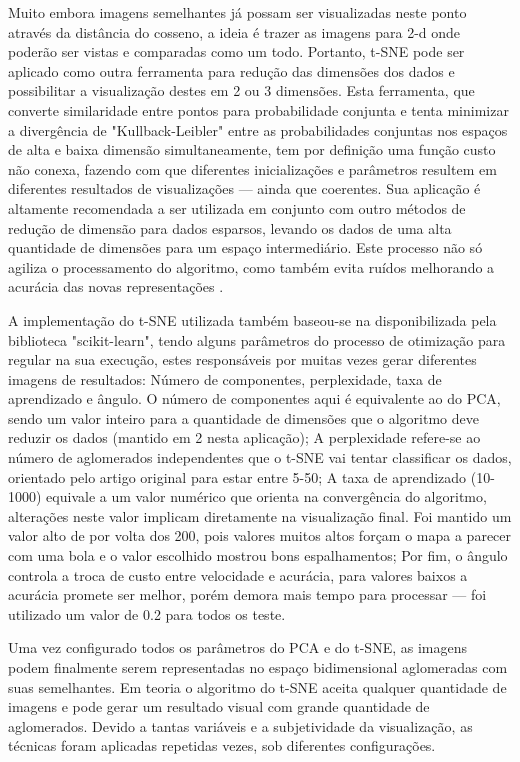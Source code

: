 \documentclass[12pt]{report}
\begin{document}
Muito embora imagens semelhantes já possam ser visualizadas neste ponto através da distância do cosseno, a ideia é trazer as imagens para 2-d onde poderão ser vistas e comparadas como um todo. Portanto, \ac{t-SNE} pode ser aplicado como outra ferramenta para redução das dimensões dos dados e possibilitar a visualização destes em 2 ou 3 dimensões. Esta ferramenta, que converte similaridade entre pontos para probabilidade conjunta e tenta minimizar a divergência de "Kullback-Leibler" entre as probabilidades conjuntas nos espaços de alta e baixa dimensão simultaneamente, tem por definição uma função custo não conexa, fazendo com que diferentes inicializações e parâmetros resultem em diferentes resultados de visualizações --- ainda que coerentes. Sua aplicação é altamente recomendada a ser utilizada em conjunto com outro métodos de redução de dimensão para dados esparsos, levando os dados de uma alta quantidade de dimensões para um espaço intermediário. Este processo não só agiliza o processamento do algoritmo, como também evita ruídos melhorando a acurácia das novas representações \cite{sklearntSNE}. 

A implementação do \ac{t-SNE} utilizada também baseou-se na disponibilizada pela biblioteca "scikit-learn", tendo alguns parâmetros do processo de otimização para regular na sua execução, estes responsáveis por muitas vezes gerar diferentes imagens de resultados: Número de componentes, perplexidade, taxa de aprendizado e ângulo. O número de componentes aqui é equivalente ao do PCA, sendo um valor inteiro para a quantidade de dimensões que o algoritmo deve reduzir os dados (mantido em 2 nesta aplicação); A perplexidade refere-se ao número de aglomerados independentes que o \ac{t-SNE} vai tentar classificar os dados, orientado pelo artigo original \cite{tsnepaper} para estar entre 5-50; A taxa de aprendizado (10-1000) equivale a um valor numérico que orienta na convergência do algoritmo, alterações neste valor implicam diretamente na visualização final. Foi mantido um valor alto de por volta dos 200, pois valores muitos altos forçam o mapa a parecer com uma bola e o valor escolhido mostrou bons espalhamentos; Por fim, o ângulo controla a troca de custo entre velocidade e acurácia, para valores baixos a acurácia promete ser melhor, porém demora mais tempo para processar --- foi utilizado um valor de 0.2 para todos os teste.  

Uma vez configurado todos os parâmetros do \ac{PCA} e do \ac{t-SNE}, as imagens podem finalmente serem representadas no espaço bidimensional aglomeradas com suas semelhantes. Em teoria o algoritmo do \ac{t-SNE} aceita qualquer quantidade de imagens e pode gerar um resultado visual com grande quantidade de aglomerados. Devido a tantas variáveis e a subjetividade da visualização, as técnicas foram aplicadas repetidas vezes, sob diferentes configurações.
\end{document}
